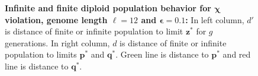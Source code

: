 \begin{figure}[h]
\begin{center}
\hspace{-3em}%
\vspace{-0.5em}  \hspace{-3em}%


\caption[\textbf{Infinite and finite diploid population behavior for $\bm{\chi}$ violation, genome length $\ell = 12$ and $\bm{\epsilon} = 0.1$}]{\textbf{Infinite and finite diploid population behavior for $\bm{\chi}$ violation, genome length $\ell = 12$ and $\bm{\epsilon} = 0.1$:} 
  In left column, $d'$ is distance of finite or infinite population to limit $\bm{z}^\ast$ for $g$ generations. In right column, $d$ is distance of finite or infinite population to limits $\bm{p}^\ast$ and $\bm{q}^\ast$. Green line is distance to $\bm{p}^\ast$ and red line is distance to $\bm{q}^\ast$.}
\label{oscillation_12d_vio_chi_0.1}
\end{center}
\end{figure}

